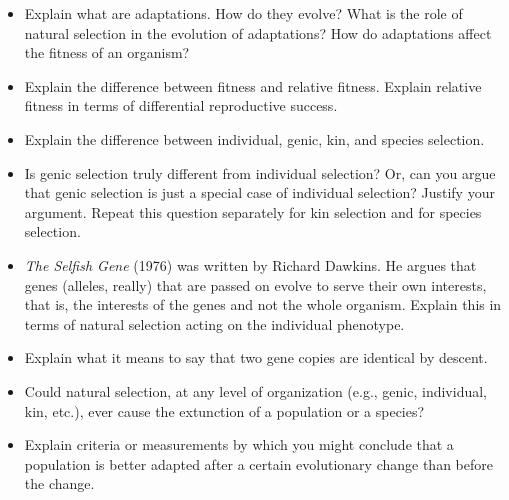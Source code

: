 \documentclass[letterpaper]{tufte-handout}
\begin{document}
\begin{itemize}
	
	\item Explain what are adaptations. How do they evolve? What is the role of natural selection in the evolution of adaptations? How do adaptations affect the fitness of an organism?
	
	\item Explain the difference between fitness and relative fitness. Explain relative fitness in terms of differential reproductive success.
	
	\item Explain the difference between individual, genic, kin, and species selection.
	
	\item Is genic selection truly different from individual selection? Or, can you argue that genic selection is just a special case of individual selection? Justify your argument. Repeat this question separately for kin selection and for species selection.
	
	\item \textit{The Selfish Gene} (1976)  was written by Richard Dawkins. He argues that genes (alleles, really) that are passed on evolve to serve their own interests, that is, the interests of the genes and not the whole organism. Explain this in terms of natural selection acting on the individual phenotype.
	
	\item Explain what it means to say that two gene copies are identical by descent.
	
	\item Could natural selection, at any level of organization (e.g., genic, individual, kin, etc.), ever cause the extunction of a population or a species?
	
	\item Explain criteria or measurements by which you might conclude that a population is better adapted after a certain evolutionary change than before the change.
	
	
	
	
	
	
	
	

\end{itemize}
\end{document}
